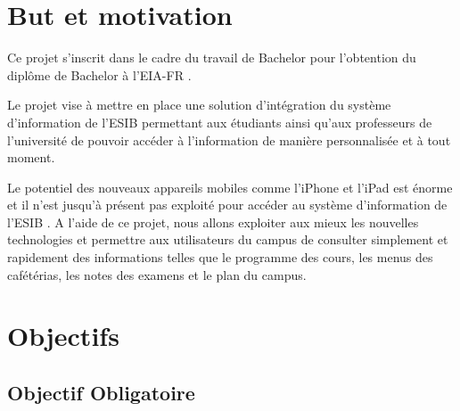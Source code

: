 
\section{But et motivation}
Ce projet s'inscrit dans le cadre du travail de Bachelor pour l'obtention du diplôme de Bachelor à l'\gls{EIA-FR} .

Le projet vise à mettre en place une solution d'intégration du système d'information de l'\gls{ESIB} permettant aux étudiants ainsi qu'aux professeurs de l'université de pouvoir accéder à l'information de manière personnalisée et à tout moment. 

Le potentiel des nouveaux appareils mobiles comme l'iPhone et l'iPad est énorme et il n'est jusqu'à présent pas exploité pour accéder au système d'information de l'\gls{ESIB} . A l'aide de ce projet, nous allons exploiter aux mieux les nouvelles technologies et permettre aux utilisateurs du campus de consulter simplement et rapidement des informations telles que le programme des cours, les menus des cafétérias, les notes des examens et le plan du campus.
\section{Objectifs}
\subsection{ Objectif Obligatoire}

